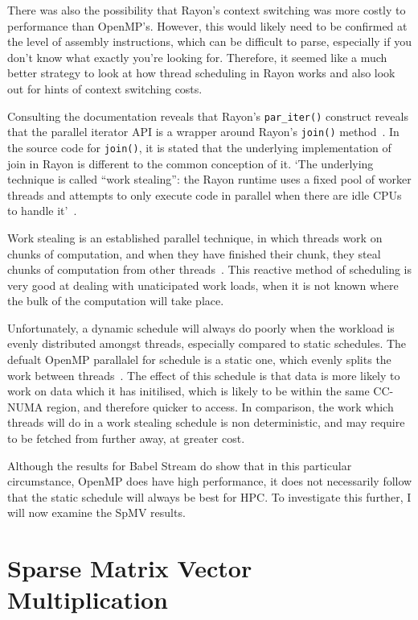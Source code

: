 There was also the possibility that Rayon's context switching was more costly to performance than OpenMP's. However, this would likely need to be confirmed at the level of assembly instructions, which can be difficult to parse, especially if you don't know what exactly you're looking for. Therefore, it seemed like a much better strategy to look at how thread scheduling in Rayon works  and also look out for hints of context switching costs.

Consulting the documentation reveals that Rayon's \texttt{par\_iter()} construct reveals that the parallel iterator API is a wrapper around Rayon's \texttt{join()} method~\cite{smallCult}. In the source code for \texttt{join()}, it is stated that the underlying implementation of join in Rayon is different to the common conception of it. 
`The underlying technique is called ``work stealing'': the
Rayon runtime uses a fixed pool of worker threads and attempts to only execute code in parallel when there are idle CPUs to handle it'~\cite{joinSrc}.

Work stealing is an established parallel technique, in which threads work on chunks of computation, and when they have finished their chunk, they steal chunks of computation from other threads~\cite{blumofe1999}. This reactive method of scheduling is very good at dealing with unaticipated work loads, when it is not known where the bulk of the computation will take place.

Unfortunately, a dynamic schedule will always do poorly when the workload is evenly distributed amongst threads, especially compared to static schedules. The defualt OpenMP parallalel for schedule is a static one, which evenly splits the work between threads~\cite{OpenMPSpec5}. The effect of this schedule is that data is more likely to work on data which it has initilised, which is likely to be within the same CC-NUMA region, and therefore quicker to access. In comparison, the work which threads will do in a work stealing schedule is non deterministic, and may require to be fetched from further away, at greater cost.

Although the results for Babel Stream do show that in this particular circumstance, OpenMP does have high performance, it does not necessarily follow that the static schedule will always be best for HPC\@. To investigate this further, I will now examine the SpMV results.

\section{Sparse Matrix Vector Multiplication}\label{sec:res-sparse}

